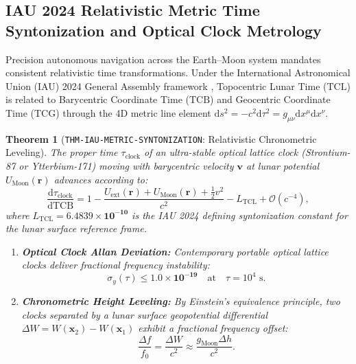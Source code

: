 \documentclass[11pt,a4paper,reqno]{article}
\theoremstyle{plain}
\newtheorem{theorem}{Theorem}[section]
\theoremstyle{definition}
\theoremstyle{remark}
\numberwithin{equation}{section}
\numberwithin{table}{section}
\providecommand{\diff}{\mathrm{d}}
\begin{document}
\subsection{IAU 2024 Relativistic Metric Time Syntonization and Optical Clock Metrology}
\label{sec:iau_relativistic_time_metrology}
Precision autonomous navigation across the Earth--Moon system mandates consistent relativistic time transformations. Under the International Astronomical Union (IAU) 2024 General Assembly framework \cite{IAU2024Time}, Topocentric Lunar Time ($\mathrm{TCL}$) is related to Barycentric Coordinate Time ($\mathrm{TCB}$) and Geocentric Coordinate Time ($\mathrm{TCG}$) through the 4D metric line element $\diff s^2 = -c^2 \diff\tau^2 = g_{\mu\nu}\diff x^\mu \diff x^\nu$.

\begin{theorem}[\texttt{THM-IAU-METRIC-SYNTONIZATION}: Relativistic Chronometric Leveling]
\label{thm:iau_metric_syntonization}
The proper time $\tau_{\mathrm{clock}}$ of an ultra-stable optical lattice clock (Strontium-87 or Ytterbium-171) moving with barycentric velocity $\bm{v}$ at lunar potential $U_{\mathrm{Moon}}(\bm{r})$ advances according to:
\begin{equation}
  \frac{\diff \tau_{\mathrm{clock}}}{\diff \mathrm{TCB}} = 1 - \frac{U_{\mathrm{ext}}(\bm{r}) + U_{\mathrm{Moon}}(\bm{r}) + \frac{1}{2}v^2}{c^2} - L_{\mathrm{TCL}} + \mathcal{O}(c^{-4}),
  \label{eq:iau_metric_time_rate}
\end{equation}
where $L_{\mathrm{TCL}} = \mathbf{6.4839 \times 10^{-10}}$ is the IAU 2024 defining syntonization constant for the lunar surface reference frame.
\begin{enumerate}[label=(\roman*)]
  \item \textbf{Optical Clock Allan Deviation:} Contemporary portable optical lattice clocks deliver fractional frequency instability:
  \begin{equation}
    \sigma_y(\tau) \le \mathbf{1.0 \times 10^{-19}} \quad \text{at} \quad \tau = 10^4\text{ s}.
  \end{equation}
  \item \textbf{Chronometric Height Leveling:} By Einstein's equivalence principle, two clocks separated by a lunar surface geopotential differential $\Delta W = W(\bm{x}_2) - W(\bm{x}_1)$ exhibit a fractional frequency offset:
  \begin{equation}
    \frac{\Delta f}{f_0} = \frac{\Delta W}{c^2} \approx \frac{g_{\mathrm{Moon}} \Delta h}{c^2}.
  \end{equation}

\end{enumerate}
\end{theorem}
\end{document}
